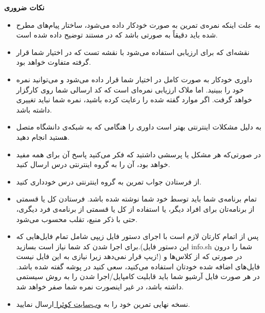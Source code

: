 \clearpage
{\LARGE  \textbf{نکات ضروری}}
\begin{itemize}
\item
به علت اینکه نمره‌ی تمرین به صورت خودکار داده می‌شود، ساختار پیام‌های
مطرح‌ شده باید دقیقاً به صورتی باشد که در مستند توضیح داده شده است. 
\item
نقشه‌ای که برای ارزیابی استفاده می‌شود با نقشه تست که در اختیار شما قرار گرفته متفاوت خواهد بود. 
\item
داوری خودکار به صورت کامل در اختیار شما قرار داده می‌شود و می‌توانید نمره خود را ببینید. اما ملاک ارزیابی نمره‌ای است که کد ارسالی شما روی کارگزار  خواهد گرفت. اگر موارد گفته شده را رعایت کرده باشید، نمره شما نباید تغییری داشته باشد.
\item
به دلیل مشکلات اینترنتی بهتر است داوری را هنگامی که به شبکه‌ی دانشگاه متصل هستید انجام دهید.
\item
در صورتی‌که هر مشکل یا پرسشی داشتید که فکر می‌کنید پاسخ آن برای همه مفید خواهد بود،
	آن را به گروه اینترنتی درس ارسال کنید.
\item
از فرستادن جواب تمرین به گروه اینترنتی درس خودداری کنید.
\item
 تمام برنامه‌ی شما باید توسط خود شما نوشته شده باشد. فرستادن کل یا قسمتی
	از برنامه‌تان برای افراد دیگر، یا استفاده از کل یا قسمتی از برنامه‌ی فرد دیگری، حتی با
	ذکر منبع، تقلب محسوب می‌شود.
\item
 پس از اتمام کارتان لازم است با اجرای دستور
فایل زیپی شامل تمام فایل‌هایی که برای اجرا شدن کد شما نیاز است بسازید.(این دستور فایل info.sh شما را درون زیپ قرار نمی‌دهد زیرا نیازی به این فایل نیست!) در صورتی که از کلاس‌ها و فایل‌های اضافه شده خودتان استفاده می‌کنید، سعی کنید در پوشه گفته شده باشد. در هر صورت فایل آرشیو شما باید قابلیت کامپایل/اجرا شدن را به روش سیستمی داشته باشد، در غیر اینصورت نمره شما صفر خواهد شد.
\item
نسخه نهایی تمرین خود را به
\href{http://quera.ir/}{
وب‌سایت کوئرا
}
ارسال نمایید.
\end{itemize}
